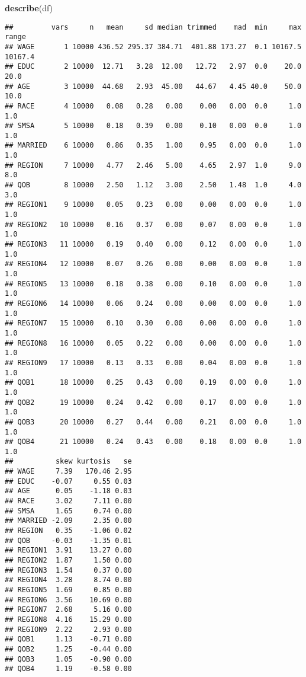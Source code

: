 \documentclass[
]{article}
\newenvironment{Shaded}{\begin{snugshade}}{\end{snugshade}}
\newcommand{\FunctionTok}[1]{\textcolor[rgb]{0.13,0.29,0.53}{\textbf{#1}}}
\newcommand{\NormalTok}[1]{#1}
\begin{document}
\begin{Shaded}
\begin{Highlighting}[]
\FunctionTok{describe}\NormalTok{(df)}
\end{Highlighting}
\end{Shaded}

\begin{verbatim}
##         vars     n   mean     sd median trimmed    mad  min     max   range
## WAGE       1 10000 436.52 295.37 384.71  401.88 173.27  0.1 10167.5 10167.4
## EDUC       2 10000  12.71   3.28  12.00   12.72   2.97  0.0    20.0    20.0
## AGE        3 10000  44.68   2.93  45.00   44.67   4.45 40.0    50.0    10.0
## RACE       4 10000   0.08   0.28   0.00    0.00   0.00  0.0     1.0     1.0
## SMSA       5 10000   0.18   0.39   0.00    0.10   0.00  0.0     1.0     1.0
## MARRIED    6 10000   0.86   0.35   1.00    0.95   0.00  0.0     1.0     1.0
## REGION     7 10000   4.77   2.46   5.00    4.65   2.97  1.0     9.0     8.0
## QOB        8 10000   2.50   1.12   3.00    2.50   1.48  1.0     4.0     3.0
## REGION1    9 10000   0.05   0.23   0.00    0.00   0.00  0.0     1.0     1.0
## REGION2   10 10000   0.16   0.37   0.00    0.07   0.00  0.0     1.0     1.0
## REGION3   11 10000   0.19   0.40   0.00    0.12   0.00  0.0     1.0     1.0
## REGION4   12 10000   0.07   0.26   0.00    0.00   0.00  0.0     1.0     1.0
## REGION5   13 10000   0.18   0.38   0.00    0.10   0.00  0.0     1.0     1.0
## REGION6   14 10000   0.06   0.24   0.00    0.00   0.00  0.0     1.0     1.0
## REGION7   15 10000   0.10   0.30   0.00    0.00   0.00  0.0     1.0     1.0
## REGION8   16 10000   0.05   0.22   0.00    0.00   0.00  0.0     1.0     1.0
## REGION9   17 10000   0.13   0.33   0.00    0.04   0.00  0.0     1.0     1.0
## QOB1      18 10000   0.25   0.43   0.00    0.19   0.00  0.0     1.0     1.0
## QOB2      19 10000   0.24   0.42   0.00    0.17   0.00  0.0     1.0     1.0
## QOB3      20 10000   0.27   0.44   0.00    0.21   0.00  0.0     1.0     1.0
## QOB4      21 10000   0.24   0.43   0.00    0.18   0.00  0.0     1.0     1.0
##          skew kurtosis   se
## WAGE     7.39   170.46 2.95
## EDUC    -0.07     0.55 0.03
## AGE      0.05    -1.18 0.03
## RACE     3.02     7.11 0.00
## SMSA     1.65     0.74 0.00
## MARRIED -2.09     2.35 0.00
## REGION   0.35    -1.06 0.02
## QOB     -0.03    -1.35 0.01
## REGION1  3.91    13.27 0.00
## REGION2  1.87     1.50 0.00
## REGION3  1.54     0.37 0.00
## REGION4  3.28     8.74 0.00
## REGION5  1.69     0.85 0.00
## REGION6  3.56    10.69 0.00
## REGION7  2.68     5.16 0.00
## REGION8  4.16    15.29 0.00
## REGION9  2.22     2.93 0.00
## QOB1     1.13    -0.71 0.00
## QOB2     1.25    -0.44 0.00
## QOB3     1.05    -0.90 0.00
## QOB4     1.19    -0.58 0.00
\end{verbatim}
\end{document}
